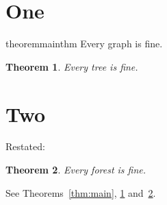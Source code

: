 \documentclass{article}
\newtheorem{theorem}{Theorem}[section]
\begin{document}
\section{One}
\begin{restatable}{theorem}{mainthm}\label{thm:main}
Every graph is fine.
\end{restatable}
\begin{theorem}\label{thm:next}
Every tree is fine.
\end{theorem}
\section{Two}
Restated:
\mainthm*
\begin{theorem}\label{thm:after}
Every forest is fine.
\end{theorem}
See Theorems~\ref{thm:main}, \ref{thm:next} and~\ref{thm:after}.
\end{document}
